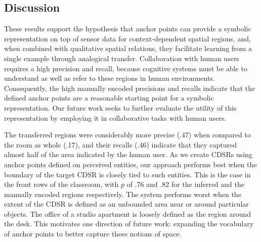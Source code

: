 \subsection{Discussion}

These results support the hypothesis that anchor points can provide a symbolic representation on top of sensor data for context-dependent spatial regions, and, when combined with qualitative spatial relations, they facilitate learning from a single example through analogical transfer. Collaboration with human users requires a high precision and recall, because cognitive systems must be able to understand as well as refer to these regions in human environments. Consequently, the high manually encoded precisions and recalls indicate that the defined anchor points are a reasonable starting point for a symbolic representation. Our future work seeks to further evaluate the utility of this representation by employing it in collaborative tasks with human users.

The transferred regions were considerably more precise (.47) when compared to the room as whole (.17), and their recalls (.46) indicate that they captured almost half of the area indicated by the human user. As we create CDSRs using anchor points defined on perceived entities, our approach performs best when the boundary of the target CDSR is closely tied to such entities. This is the case in the front rows of the classroom, with $p$ of .76 and .82 for the inferred and the manually encoded regions respectively. The system performs worst when the extent of the CDSR is defined as an unbounded area near or around particular objects. The office of a studio apartment is loosely defined as the region around the desk. This motivates one direction of future work:  expanding the vocabulary of anchor points to better capture these notions of space.
